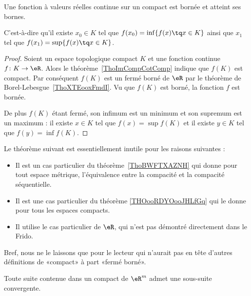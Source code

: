 \begin{theorem}\label{ThoMKKooAbHaro}
    Une fonction à valeurs réelles continue sur un compact est bornée et atteint ses bornes.

	C'est-à-dire qu'il existe $x_0\in K$ tel que $f(x_0)=\inf\{ f(x)\tq x\in K \}$ ainsi que $x_1$ tel que $f(x_1)=\sup\{ f(x)\tq x\in K \}$.
\end{theorem}

\begin{proof}
    Soient un espace topologique compact \( K\) et une fonction continue \( f\colon K\to \eR\). Alors le théorème~\ref{ThoImCompCotComp} indique que \( f(K)\) est compact. Par conséquent \( f(K)\) est un fermé borné de \( \eR\) par le théorème de Borel-Lebesgue~\ref{ThoXTEooxFmdI}. Vu que \( f(K)\) est borné, la fonction \( f\) est bornée.

    De plus \( f(K)\) étant fermé, son infimum est un minimum et son supremum est un maximum : il existe \( x\in K\) tel que \( f(x)=\sup f(K)\) et il existe \( y\in K\) tel que \( f(y)=\inf f(K)\).
\end{proof}

Le théorème suivant est essentiellement inutile pour les raisons suivantes :
\begin{itemize}
    \item 
        Il est un cas particulier du théorème~\ref{ThoBWFTXAZNH} qui donne pour tout espace métrique, l'équivalence entre la compacité et la compacité séquentielle.
    \item
        Il est une cas particulier du théorème \ref{THOooRDYOooJHLfGq} qui le donne pour tous les espaces compacts.
    \item
        Il utilise le cas particulier de \( \eR\), qui n'est pas démontré directement dans le Frido.
\end{itemize}
Bref, nous ne le laissons que pour le lecteur qui n'aurait pas en tête d'autres définitions de «compact» à part «fermé borné».

\begin{theorem}		\label{ThoBolzanoWeierstrassRn}
	Toute suite contenue dans un compact de \( \eR^m\) admet une sous-suite convergente.
\end{theorem}

